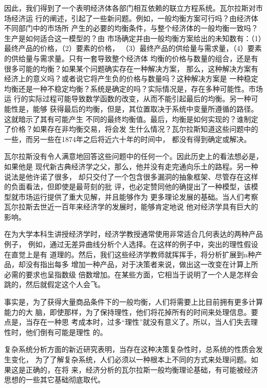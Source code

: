 因此，我们得到了一个表明经济体各部门相互依赖的联立方程系统。瓦尔拉斯对市场经济运
行的阐述，引起了一些新问题。例如，一般均衡方案可行吗？由经济体不同部门中的市场所
产生的必要的均衡条件，与整个经济体的一般均衡一致吗？生产是如何适合这一模型的？由
市场确定并由一般均衡方案给出的未知数有：（1）最终产品的价格，（2）要素的价格，
（3）最终产品的供给量与需求量，（4）要素的供给量与需求量。只有一套导致整个经济体
均衡的价格与数量的组合，还是有很多可能的均衡？如果某个问题确实存在一种解决方案，
那么，这种解决方案有经济上的意义吗？或者说它将产生负的价格与数量吗？这种解决方案是
一种稳定均衡还是一种不稳定均衡？系统是确定的吗？实际情况是，存在多种可能性。市场运
行的实际过程可能导致数学函数的改变，从而不能引起最后的均衡。另一种可能性是，能够
获得最后的均衡，但是，其位置取决于系统中变量所遵循的路径。这就暗示了其有可能产生
不同的最终均衡值。最后，均衡是如何实现的？谁制定了价格？如果存在非均衡交易，将会发
生什么情况？瓦尔拉斯知道这些问题中的一些，而另一些在1874年之后将近六十年的时间中，
都没有得到确定或解决。

瓦尔拉斯没有令人满意地回答这些问题中的任何一个。因此历史上的看法想必是，如果他是
现代新古典经济学之父，那么，他并没有走完通向乐土的路程。另一种说法是他许诺了很多，
却只交付了一个包含很多漏洞的抽象框架、尽管存在这样的负面看法，但即使是最苛刻的批
评，也必定赞同他的确提出了一种模型，该模型就市场运行提供了重大见解，并且能够作为
更多理论发展的基础。当人们考察瓦尔拉斯去世近一百年来经济学的发展时，能够肯定地说
他对经济学具有巨大的影响。

\begin{tcolorbox}[title = {一般均衡、复杂性以及人类大脑的极限},
  fonttitle = \sffamily\bfseries, fontupper = \small\itshape, fontlower =
  \small\itshape, left=20pt]
  \begin{multicols}{2}
    在为大学本科生讲授经济学时，经济学教授通常使用非常适合几何表达的两种产品例子，
    例如，通过无差异曲线分析个人选择。在这样的例子中，突出的理性假设在直觉上是有
    道理的。然后，我们这些经济学教师就挥挥手，将分析扩展到n种产品，却没有指出每多
    增加一种产品，对于决策者来说，做出这一改变在计算上所必需的要求也呈指数级
倍数增加。在某些方面，它相当于说明了一个人是怎样会跳的，然后就假定这个人会飞。

事实是，为了获得大量商品条件下的一般均衡，人们将需要上比目前拥有更多计算能力的大
脑，即使那样，为了保持理性，他们将花掉所有的时间来处理信息。要点是，当存在一种思
考成本时，过多“理性”就没有意义了。所以，当人们失去理性时，他们倒有可能是理性
的。

复杂系统分析方面的新近研究表明，当存在这种决策复杂性时，总系统的性质会发生变化，
为了了解复杂系统，人们必须以一种根本上不同的方式来处理问题。如果这是正确的，在将
来，经济分析的瓦尔拉斯一般均衡理论基础，有可能被经济思想的一些其它基础彻底取代。
  \end{multicols}
\end{tcolorbox}

